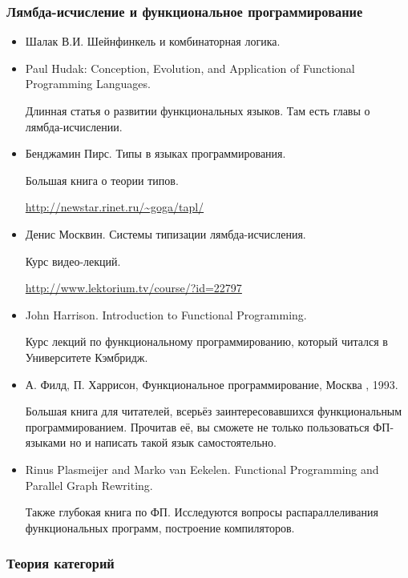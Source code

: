 \subsubsection{Лямбда-исчисление и функциональное программирование}

\begin{itemize}
\item Шалак В.И. Шейнфинкель и комбинаторная логика.
    
\item Paul Hudak: Conception, Evolution, and Application 
        of Functional Programming Languages.

      Длинная статья о развитии функциональных языков.
      Там есть главы о лямбда-исчислении. 

\item Бенджамин Пирс. Типы в языках программирования.

     Большая книга о теории типов. 

     \url{http://newstar.rinet.ru/~goga/tapl/}

\item Денис Москвин. Системы типизации лямбда-исчисления. 

    Курс видео-лекций.

    \url{http://www.lektorium.tv/course/?id=22797}

\item John Harrison. Introduction to Functional Programming.

    Курс лекций по функциональному программированию, который
    читался в Университете Кэмбридж.

\item А. Филд, П. Харрисон, Функциональное программирование,
    Москва , 1993. 

    Большая книга для читателей, всерьёз заинтересовавшихся
    функциональным программированием. Прочитав её, вы 
    сможете не только пользоваться ФП-языками но и написать 
    такой язык самостоятельно.

\item Rinus Plasmeijer and Marko van Eekelen. Functional Programming
    and Parallel Graph Rewriting.

    Также глубокая книга по ФП. Исследуются вопросы распараллеливания
    функциональных программ, построение компиляторов. 


\end{itemize}

\subsubsection{Теория категорий}


